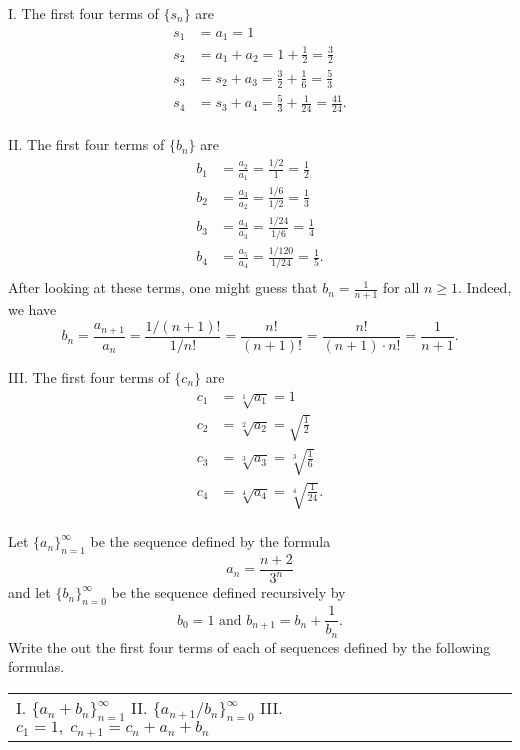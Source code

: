 \documentclass[]{ximera}
\begin{document}
\begin{freeResponse}
I. The first four terms of $\{s_n\}$ are 
\begin{align*}
s_1 &= a_1 = 1\\
s_2 &= a_1 + a_2 = 1 + \frac{1}{2} = \frac{3}{2}\\
s_3 &= s_2 + a_3 = \frac{3}{2} + \frac{1}{6} = \frac{5}{3} \\
s_4 &= s_3 + a_4  = \frac{5}{3} + \frac{1}{24} = \frac{41}{24}.\\
\end{align*}

II. The first four terms of $\{b_n\}$ are 
\begin{align*}
b_1 &= \frac{a_2}{a_1} = \frac{1/2}{1} = \frac{1}{2} \\
b_2 &= \frac{a_3}{a_2} = \frac{1/6}{1/2} = \frac{1}{3} \\
b_3 &= \frac{a_4}{a_3} = \frac{1/24}{1/6} = \frac{1}{4} \\
b_4 &= \frac{a_5}{a_4} = \frac{1/120}{1/24} = \frac{1}{5}.\\
\end{align*}
After looking at these terms, one might guess that $b_n = \frac{1}{n+1}$ for all $n \geq 1$. Indeed, we have
$$
b_n = \frac{a_{n+1}}{a_n} = \frac{1/(n+1)!}{1/n!} = \frac{n!}{(n+1)!} = \frac{n!}{(n+1) \cdot n!} = \frac{1}{n+1}.
$$

III. The first four terms of $\{c_n\}$ are
\begin{align*}
c_1 &= \sqrt[1]{a_1} = 1\\
c_2 &= \sqrt[2]{a_2} = \sqrt{\frac{1}{2}} \\
c_3 &= \sqrt[3]{a_3} = \sqrt[3]{\frac{1}{6}} \\
c_4 &= \sqrt[4]{a_4} = \sqrt[4]{\frac{1}{24}}.\\
\end{align*}
\end{freeResponse}

\begin{problem}
Let $\{a_n\}_{n=1}^\infty$ be the sequence defined by the formula
$$
a_n = \frac{n+2}{3^n}
$$
and let $\{b_n\}_{n=0}^\infty$ be the sequence defined recursively by
$$
b_0 = 1 \mbox{ and } b_{n+1} = b_n + \frac{1}{b_n}.
$$
Write the out the first four terms of each of sequences defined by the following formulas.
\begin{center}
\begin{tabular}{lll}
I. $\{a_n+b_n\}_{n=1}^\infty$ \hspace{.3in} II. $\{a_{n+1}/b_n\}_{n=0}^\infty$ \hspace{.3in} III. $c_1 = 1, \; c_{n+1} = c_n + a_n + b_n$
\end{tabular}
\end{center}
\end{problem}
\end{document}
